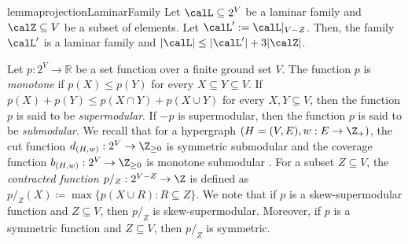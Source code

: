 \documentclass{article}
\def\Cref#1{<#1>}%
\newcommand{\zeros}{\ensuremath{\mathcal{Z}}\xspace}
\newcommand{\knote}[1]{{\color{red}[{\tiny Karthik: \bf #1}]\marginpar{\color{red}*}}}
\newcommand{\functionContract}[2]{\ensuremath{{#1}/_{#2}}\xspace}
\newcommand{\functionRestrict}[2]{\ensuremath{{#1}\backslash_{#2}}\xspace}
\begin{document}
\begin{restatable}{lemma}{projectionLaminarFamily}\label{lem:CoveringAlgorithm:projection-laminar-family}
    Let $\calL \subseteq 2^V$ be a laminar family and $\calZ \subseteq V$ be a subset of elements. 
    Let $\calL':=\calL|_{V-\zeros}$. 
    Then, the family $\calL'$ is a laminar family and $|\calL| \leq |\calL'| + 3|\calZ|$.
\end{restatable}



Let $p: 2^{V} \rightarrow \mathbb{R}$ be a set function over a finite ground set $V$. 
The function $p$ is \emph{monotone} if  $p(X)\le p(Y)$ for every $X\subseteq Y\subseteq V$. 
If $p(X)+p(Y)\le p(X\cap Y)+p(X\cup Y)$
for every $X,Y\subseteq V$, then the function $p$ is said to be \emph{supermodular}. 
If $-p$ is supermodular, then the function $p$ is said to be \emph{submodular}. 
We recall that for a hypergraph $(H=(V, E), w: E\rightarrow \Z_+)$, the cut function $d_{(H, w)}: 2^V\rightarrow \Z_{\ge 0}$ is symmetric submodular and the coverage function $b_{(H, w)}: 2^V\rightarrow \Z_{\ge 0}$ is monotone submodular \cite{Frank-book}. 
For a subset $Z \subseteq V$, the \emph{contracted function} $\functionContract{p}{Z} : 2^{V - Z}\rightarrow\Z$ is defined as $\functionContract{p}{Z}(X) \coloneqq  \max\{p(X\cup R) : R \subseteq Z\}$. We note that if $p$ is a skew-supermodular function and $Z\subseteq V$, then $\functionContract{p}{Z}$ is skew-supermodular. Moreover, if $p$ is a symmetric function and $Z\subseteq V$, then $\functionContract{p}{Z}$ is symmetric. 
\end{document}
